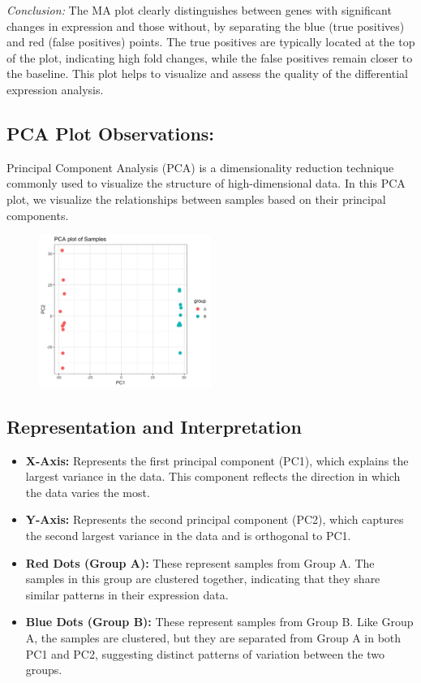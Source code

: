 \documentclass[12pt]{article}
\begin{document}
\textit{Conclusion:} The MA plot clearly distinguishes between genes with significant changes in expression and those without, by separating the blue (true positives) and red (false positives) points. The true positives are typically located at the top of the plot, indicating high fold changes, while the false positives remain closer to the baseline. This plot helps to visualize and assess the quality of the differential expression analysis.

\subsection{PCA Plot Observations:} Principal Component Analysis (PCA) is a dimensionality reduction technique commonly used to visualize the structure of high-dimensional data. In this PCA plot, we visualize the relationships between samples based on their principal components.

\begin{figure}[h]
  \centering
  \includegraphics[width=0.5\textwidth]{figure/pca.png}  %
\end{figure}

\subsection*{Representation and Interpretation}
\begin{itemize}
  \item \textbf{X-Axis:} Represents the first principal component (PC1), which explains the largest variance in the data. This component reflects the direction in which the data varies the most.
  \item \textbf{Y-Axis:} Represents the second principal component (PC2), which captures the second largest variance in the data and is orthogonal to PC1.
  \item \textbf{Red Dots (Group A):} These represent samples from Group A. The samples in this group are clustered together, indicating that they share similar patterns in their expression data.
  \item \textbf{Blue Dots (Group B):} These represent samples from Group B. Like Group A, the samples are clustered, but they are separated from Group A in both PC1 and PC2, suggesting distinct patterns of variation between the two groups.
\end{itemize}
\end{document}

